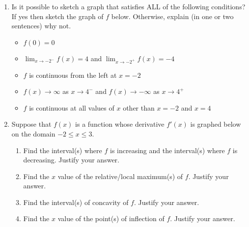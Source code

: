 \documentclass[letterpaper,12pt,fleqn]{article}
\begin{document}
\begin{enumerate}[left=0in]
  \newpage

\item Is it possible to sketch a graph that satisfies ALL of the following conditions?  If yes then sketch the graph of
  \(f\) below.  Otherwise, explain (in one or two sentences) why not.
  \begin{itemize}
  \item \(f(0)=0\)
  \item \(\displaystyle\lim_{x\to-2^-}f(x)=4\) and \(\displaystyle\lim_{x\to-2^+}f(x)=-4\)
  \item \(f\) is continuous from the left at \(x=-2\)
  \item \(f(x)\to\infty\) as \(x\to4^-\) and \(f(x)\to-\infty\) as \(x\to4^+\)
  \item \(f\) is continuous at all values of \(x\) other than \(x=-2\) and \(x=4\)
  \end{itemize}

  \newpage

\item Suppose that \(f(x)\) is a function whose derivative \(f'(x)\) is graphed below on the domain
\(-2\le x\le 3\).

  \vspace{0.25in}


  \vspace{0.25in}

  \begin{enumerate}
  \item Find the interval(s) where \(f\) is increasing and the interval(s) where \(f\) is decreasing.  Justify
    your answer.

    \newpage
    
  \item Find the \(x\) value of the relative/local maximum(s) of \(f\).  Justify your answer.

    \vspace{2in}

    
  \item Find the interval(s) of concavity of \(f\).  Justify your answer.

    \vspace{2in}
    
  \item Find the \(x\) value of the point(s) of inflection of \(f\).  Justify your answer.
  \end{enumerate}
\end{enumerate}
\end{document}
